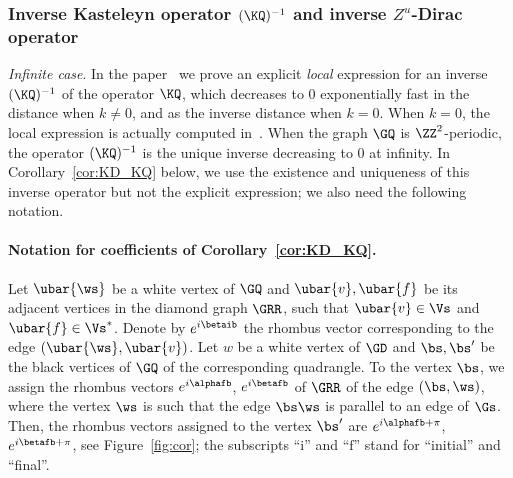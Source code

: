 \documentclass[a4paper,twoside,11pt]{article}
\begin{document}
\subsubsection{Inverse Kasteleyn operator $(\KQ)^{-1}$ and inverse $Z^u$-Dirac operator}

\emph{Infinite case}.
In the paper~\cite{BdtR2} we prove an explicit 
\emph{local} expression for an inverse $(\KQ)^{-1}$ of the operator $\KQ$, which decreases to 0 exponentially fast in the distance 
when $k\neq 0$, and as the inverse distance when $k=0$. When $k=0$, the local expression is actually computed in~\cite{Kenyon3}.
When the graph $\GQ$ is $\ZZ^2$-periodic, the operator $(\KQ)^{-1}$ is the unique inverse decreasing to 0 at infinity.
In Corollary~\ref{cor:KD_KQ} below, we use the existence and uniqueness of this inverse operator but not the explicit expression; 
we also need the following notation.

\paragraph{Notation for coefficients of Corollary~\ref{cor:KD_KQ}.} 
Let $\ubar{\ws}$ be a white vertex of $\GQ$ and $\ubar{v},\ubar{f}$ be its adjacent vertices in the diamond graph $\GRR$, 
such that $\ubar{v}\in\Vs$ and $\ubar{f}\in\Vs^*$.
Denote by $e^{i\betaib}$ the rhombus vector corresponding to the edge $(\ubar{\ws},\ubar{v})$. 
Let $w$ be a white vertex of $\GD$ and $\bs,\bs'$ be the black vertices of $\GQ$ of the corresponding quadrangle. 
To the vertex $\bs$, we assign the rhombus vectors $e^{i\alphafb}$, $e^{i\betafb}$ of $\GRR$ of the edge $(\bs,\ws)$, where 
the vertex $\ws$ is such that the edge $\bs\ws$ is parallel to an edge of $\Gs$. 
Then, the rhombus vectors assigned to the vertex $\bs'$ are $e^{i\alphafb+\pi}$, $e^{i\betafb+\pi}$, see Figure~\ref{fig:cor};
the subscripts ``$\mathrm{i}$'' and ``$\mathrm{f}$'' stand for ``initial'' and ``final''.
\end{document}
